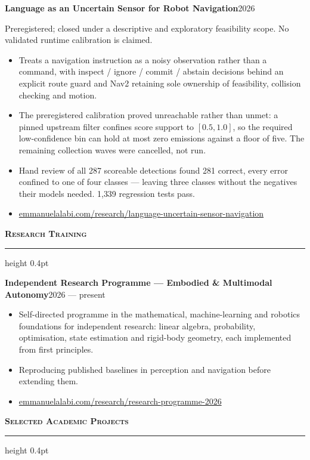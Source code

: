 \documentclass[10pt,a4paper]{article}
\newcommand{\cvsection}[1]{%
  \vspace{0.95em}%
  {\normalsize\bfseries\scshape #1}\par
  \vspace{0.25em}%
  \hrule height 0.4pt
  \vspace{0.6em}%
}
\newcommand{\cventry}[2]{%
  \textbf{#1}\hfill{\small #2}\par\vspace{0.15em}%
}
\newenvironment{cvitems}{%
  \begin{itemize}%
    \setlength{\itemsep}{0.12em}%
    \setlength{\parskip}{0pt}%
    \setlength{\parsep}{0pt}%
    \setlength{\topsep}{0.25em}%
    \setlength{\partopsep}{0pt}%
}{%
  \end{itemize}%
  \vspace{0.25em}%
}
\begin{document}
\cventry{Language as an Uncertain Sensor for Robot Navigation}{2026}
{\small Preregistered; closed under a descriptive and exploratory feasibility scope.
No validated runtime calibration is claimed.}
\begin{cvitems}
  \item Treats a navigation instruction as a noisy observation rather than a
        command, with inspect / ignore / commit / abstain decisions behind an
        explicit route guard and Nav2 retaining sole ownership of feasibility,
        collision checking and motion.
  \item The preregistered calibration proved unreachable rather than unmet: a
        pinned upstream filter confines score support to $[0.5, 1.0]$, so the
        required low-confidence bin can hold at most zero emissions against a
        floor of five. The remaining collection waves were cancelled, not run.
  \item Hand review of all 287 scoreable detections found 281 correct, every
        error confined to one of four classes --- leaving three classes without
        the negatives their models needed. 1{,}339 regression tests pass.
  \item \href{https://www.emmanuelalabi.com/research/language-uncertain-sensor-navigation}{emmanuelalabi.com/research/language-uncertain-sensor-navigation}
\end{cvitems}

\cvsection{Research Training}

\cventry{Independent Research Programme --- Embodied \& Multimodal Autonomy}{2026 --- present}
\begin{cvitems}
  \item Self-directed programme in the mathematical, machine-learning and
        robotics foundations for independent research: linear algebra,
        probability, optimisation, state estimation and rigid-body geometry,
        each implemented from first principles.
  \item Reproducing published baselines in perception and navigation before
        extending them.
  \item \href{https://www.emmanuelalabi.com/research/research-programme-2026}{emmanuelalabi.com/research/research-programme-2026}
\end{cvitems}

\cvsection{Selected Academic Projects}
\end{document}
